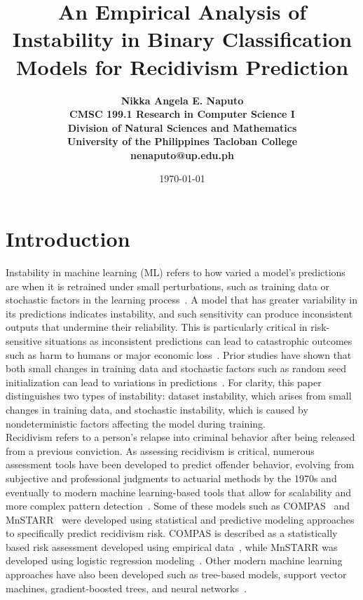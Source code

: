 \documentclass{article}
\title{\bfseries An Empirical Analysis of Instability in Binary Classification Models for Recidivism Prediction}
\author{\bfseries Nikka Angela E. Naputo\\
CMSC 199.1 Research in Computer Science I\\
Division of Natural Sciences and Mathematics\\
University of the Philippines Tacloban College\\
{\small nenaputo@up.edu.ph}
}
\date{\today}
\begin{document}
\sloppy %

\maketitle 
\newpage

\tableofcontents %
\newpage %

\section{Introduction} %
\tab%
Instability in machine learning (ML) refers to how varied a model's predictions are when it is retrained under small perturbations, such as training data or stochastic factors in the learning process~\cite{sun2015stability}. A model that has greater variability in its predictions indicates instability, and such sensitivity can produce inconsistent outputs that undermine their reliability. This is particularly critical in risk-sensitive situations as inconsistent predictions can lead to catastrophic outcomes such as harm to humans or major economic loss~\cite{zhang2024reliability}. Prior studies have shown that both small changes in training data and stochastic factors such as random seed initialization can lead to variations in predictions~\cite{riley2023stability, lopez2022instability}. For clarity, this paper distinguishes two types of instability: dataset instability, which arises from small changes in training data, and stochastic instability, which is caused by nondeterministic factors affecting the model during training. \\

Recidivism refers to a person's relapse into criminal behavior after being released from a previous conviction. As assessing recidivism is critical, numerous assessment tools have been developed to predict offender behavior, evolving from subjective and professional judgments to actuarial methods by the 1970s and eventually to modern machine learning-based tools that allow for scalability and more complex pattern detection~\cite{bonta2007risk, duwe2017out}. Some of these models such as COMPAS~\cite{northpointe2015practitioner} and MnSTARR~\cite{duwe2014development} were developed using statistical and predictive modeling approaches to specifically predict recidivism risk. COMPAS is described as a statistically based risk assessment developed using empirical data~\cite{northpointe2015practitioner}, while MnSTARR was developed using logistic regression modeling~\cite{duwe2014development}. Other modern machine learning approaches have also been developed such as tree-based models, support vector machines, gradient-boosted trees, and neural networks~\cite{duwe2017out}.\\
\end{document}
